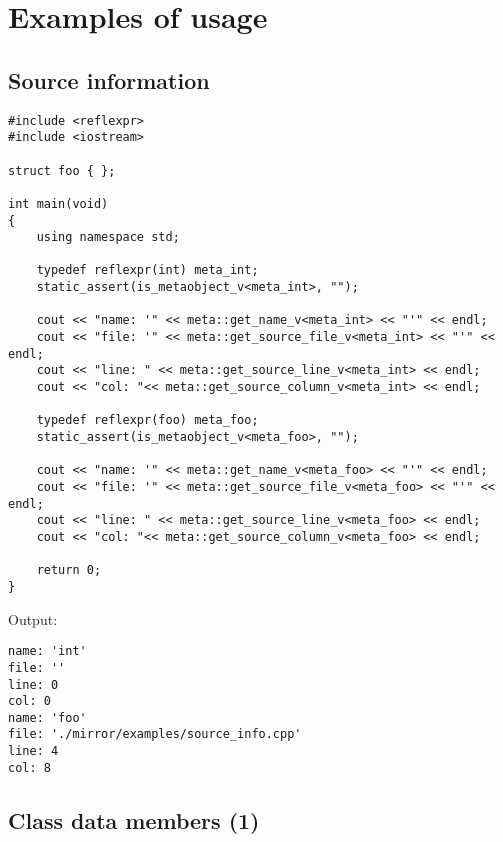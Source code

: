 \section{Examples of usage}
\label{section-reflexpr-examples}

\subsection{Source information}

\begin{verbatim}
#include <reflexpr>
#include <iostream>

struct foo { };

int main(void)
{
	using namespace std;

	typedef reflexpr(int) meta_int;
	static_assert(is_metaobject_v<meta_int>, "");

	cout << "name: '" << meta::get_name_v<meta_int> << "'" << endl;
	cout << "file: '" << meta::get_source_file_v<meta_int> << "'" << endl;
	cout << "line: " << meta::get_source_line_v<meta_int> << endl;
	cout << "col: "<< meta::get_source_column_v<meta_int> << endl;

	typedef reflexpr(foo) meta_foo;
	static_assert(is_metaobject_v<meta_foo>, "");

	cout << "name: '" << meta::get_name_v<meta_foo> << "'" << endl;
	cout << "file: '" << meta::get_source_file_v<meta_foo> << "'" << endl;
	cout << "line: " << meta::get_source_line_v<meta_foo> << endl;
	cout << "col: "<< meta::get_source_column_v<meta_foo> << endl;

	return 0;
}
\end{verbatim}

Output:

\begin{verbatim}
name: 'int'
file: ''
line: 0
col: 0
name: 'foo'
file: './mirror/examples/source_info.cpp'
line: 4
col: 8
\end{verbatim}

\subsection{Class data members (1)}


